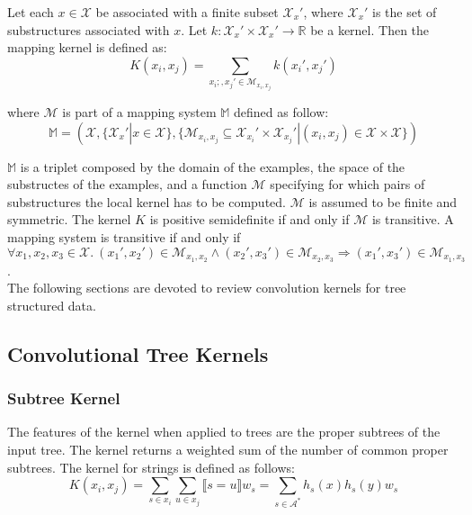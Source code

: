 \begin{definition}
Let each $x \in \mathcal{X}$ be associated with a finite subset $\mathcal{X}_x'$,
where $\mathcal{X}_x'$ is the set of substructures associated with $x$.
Let $k: \mathcal{X}_x' \times \mathcal{X}_x' \rightarrow \mathbb{R}$ be a
kernel.
Then the mapping kernel is defined as:
\begin{equation}
	K(x_i, x_j) = \sum_{x_i;, x_j' \in \mathcal{M}_{x_i, x_j}} k(x_i', x_j')
\end{equation}

where $\mathcal{M}$ is part of a mapping system $\mathbb{M}$ defined as follow:
\begin{equation}
	\mathbb{M} = 
	\left( 
		\mathcal{X}, 
		\{ \mathcal{X}_x' | x \in \mathcal{X} \},
		\{ \mathcal{M}_{x_i, x_j} \subseteq 
			\mathcal{X}_{x_i}' \times \mathcal{X}_{x_j}' | 
			(x_i, x_j) \in \mathcal{X} \times \mathcal{X} \} 
	\right)
\end{equation}
\end{definition}

$\mathbb{M}$ is a triplet composed by the domain of the examples, the space of 
the substructes of the examples, and a function $\mathcal{M}$ specifying for 
which pairs of substructures the local kernel has to be computed.
$\mathcal{M}$ is assumed to be finite and symmetric.
The kernel $K$ is positive semidefinite if and only if $\mathcal{M}$ is
transitive. A mapping system is transitive if and only if $\forall x_1, x_2, x_3
\in \mathcal{X}. \ (x_1', x_2') \in \mathcal{M}_{x_1, x_2} \land (x_2', x_3')
\in \mathcal{M}_{x_2, x_3} \Rightarrow (x_1', x_3') \in \mathcal{M}_{x_1,
x_3}$.\\

The following sections are devoted to review convolution kernels for tree 
structured data.

\subsection{Convolutional Tree Kernels}

\subsubsection{Subtree Kernel}

The features of the kernel when applied to trees are the proper subtrees of the 
input tree. The kernel returns a weighted sum of the number of common proper
subtrees. The kernel for strings is defined as follows:
\begin{equation}
	K(x_i, x_j) = 
	\sum_{s \in x_i} \sum_{u \in x_j} \llbracket s = u \rrbracket w_s = 
	\sum_{s \in \mathcal{A}^*} h_s(x) h_s(y)w_s
\end{equation}

